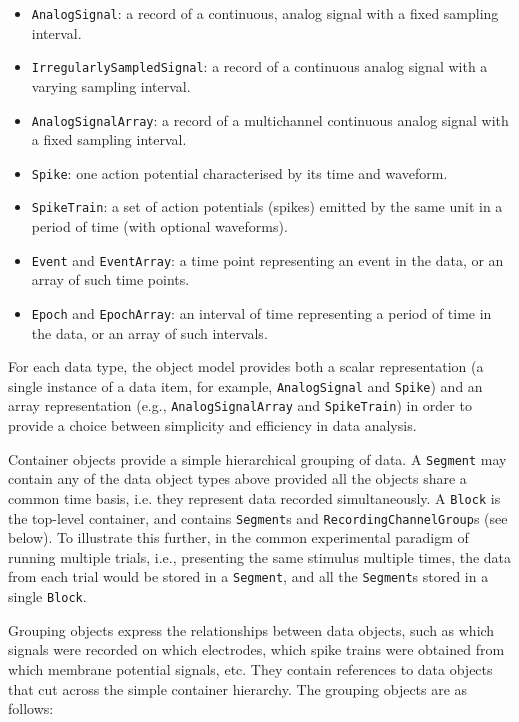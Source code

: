 \documentclass{frontiers}
\begin{document}
\begin{itemize}
\item \lstinline`AnalogSignal`: a record of a continuous, analog signal with a fixed sampling interval.
\item \lstinline`IrregularlySampledSignal`: a record of a continuous analog signal with a varying sampling interval.
\item \lstinline`AnalogSignalArray`: a record of a multichannel continuous analog signal with a fixed sampling interval.
\item \lstinline`Spike`: one action potential characterised by its time and waveform.
\item \lstinline`SpikeTrain`: a set of action potentials (spikes) emitted by the same unit in a period of time (with optional waveforms).
\item \lstinline`Event` and \lstinline`EventArray`: a time point representing an event in the data, or an array of such time points.
\item \lstinline`Epoch` and \lstinline`EpochArray`: an interval of time representing a period of time in the data, or an array of such intervals.
\end{itemize}

For each data type, the object model provides both a scalar representation (a single instance of a data item, for example, \lstinline`AnalogSignal` and \lstinline`Spike`) and an array representation (e.g., \lstinline`AnalogSignalArray` and \lstinline`SpikeTrain`) in order to provide a choice between simplicity and efficiency in data analysis.

Container objects provide a simple hierarchical grouping of data. 
A \lstinline`Segment` may contain any of the data object types above provided all the objects share a common time basis, i.e. they represent data recorded simultaneously. 
A \lstinline`Block` is the top-level container, and contains \lstinline`Segment`s and \lstinline`RecordingChannelGroup`s (see below).
To illustrate this further, in the common experimental paradigm of running multiple trials, i.e., presenting the same stimulus multiple times, the data from each trial would be stored in a \lstinline`Segment`, and all the \lstinline`Segment`s stored in a single \lstinline`Block`. 

Grouping objects express the relationships between data objects, such as which signals were recorded on which electrodes, which spike trains were obtained from which membrane potential signals, etc.
They contain references to data objects that cut across the simple container hierarchy.
The grouping objects are as follows:
\end{document}
